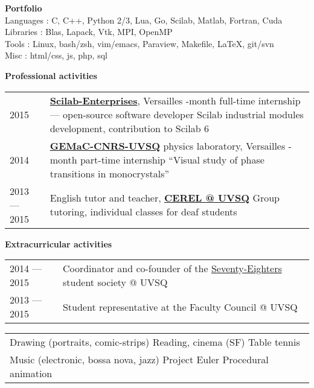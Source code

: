 \documentclass[pdftex,a4paper,10pt]{article}
\begin{document}
{\large\bf Portfolio}
\hrulefill\\[.2cm]
Languages : C, C++, Python 2/3, Lua, Go, Scilab, Matlab, Fortran, Cuda \\
Libraries : Blas, Lapack, Vtk, MPI, OpenMP \\
Tools : Linux, bash/zsh, vim/emacs, Paraview, Makefile, \LaTeX, git/svn \\
Misc : html/css, js, php, sql
\vspace{.3cm}

{\large\bf Professional activities}
\hrulefill\\[.2cm]
{\setlength{\extrarowheight}{.2cm}
\begin{tabularx}{\textwidth}{lX}
2015 &
\href{http://www.scilab-enterprises.com}
{\bf Scilab-Enterprises}, Versailles
\newline
4-month full-time internship \---- open-source software developer
\newline
Scilab industrial modules development, contribution to Scilab 6
\\
2014 &
\href{http://www.gemac.uvsq.fr/}
{\bf GEMaC-CNRS-UVSQ} physics laboratory, Versailles
\newline
6-month part-time internship
\newline
``Visual study of phase transitions in monocrystals''\\
2013 \---- 2015 &
English tutor and teacher,
\href{http://www.cerel.uvsq.fr/presentation-291090.kjsp}
{\bf CEREL \makeatletter @ \makeatother UVSQ}
\newline
Group tutoring, individual classes for deaf students\
\end{tabularx}}
\vspace{.3cm}

{\large\bf Extracurricular activities}
\hrulefill\\[.3cm]
{\setlength{\extrarowheight}{.15cm}
\begin{tabularx}{\textwidth}{lX}
2014 \---- 2015 &
Coordinator and co-founder of the
\href{https://www.facebook.com/pages/Seventy-Eighters/508772502567015}
{Seventy-Eighters} student society
\makeatletter @ \makeatother UVSQ \\
2013 \---- 2015 &
Student representative at the Faculty Council
\makeatletter @ \makeatother UVSQ
\end{tabularx}}
\newline
{\setlength{\extrarowheight}{.15cm}
\begin{tabularx}{\textwidth}{X}
Drawing (portraits, comic-strips) \hfill
Reading, cinema (SF) \hfill
Table tennis \\
Music (electronic, bossa nova, jazz) \hfill
Project Euler \hfill
Procedural animation
\end{tabularx}}
\end{document}
